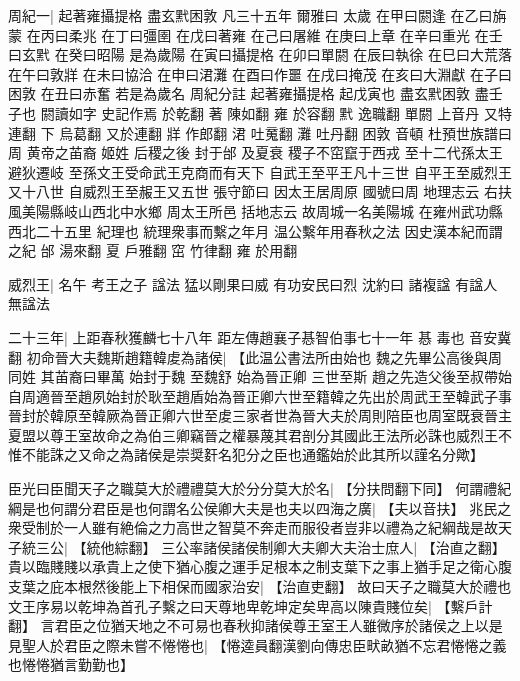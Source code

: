 % 
% 
% 

周紀一|{
	起著雍攝提格 盡玄黓困敦 凡三十五年
	爾雅曰
	太歲
	在甲曰閼逢
	在乙曰旃蒙
	在丙曰柔兆
	在丁曰彊圉
	在戊曰著雍
	在己曰屠維
	在庚曰上章
	在辛曰重光
	在壬曰玄黓
	在癸曰昭陽
	是為歲陽
	在寅曰攝提格
	在卯曰單閼
	在辰曰執徐
	在巳曰大荒落
	在午曰敦牂
	在未曰協洽
	在申曰涒灘
	在酉曰作噩
	在戌曰掩茂
	在亥曰大淵獻
	在子曰困敦
	在丑曰赤奮
	若是為歲名
	周紀分註 起著雍攝提格 起戊寅也
	盡玄黓困敦 盡壬子也
	閼讀如字 史記作焉 於乾翻
	著 陳如翻
	雍 於容翻
	黓 逸職翻
	單閼 上音丹 又特連翻
	下 烏葛翻 又於連翻
	牂 作郎翻
	涒 吐䰟翻
	灘 吐丹翻
	困敦 音頓
	杜預世族譜曰 周 黄帝之苖裔 姬姓
	后稷之後 封于邰 及夏衰 稷子不窋竄于西戎
	至十二代孫太王 避狄遷岐
	至孫文王受命武王克商而有天下
	自武王至平王凡十三世
	自平王至威烈王又十八世
	自威烈王至赧王又五世
	張守節曰 因太王居周原 國號曰周
	地理志云 右扶風美陽縣岐山西北中水鄉 周太王所邑
	括地志云 故周城一名美陽城 在雍州武功縣西北二十五里 紀理也 統理衆事而繫之年月
	温公繫年用春秋之法 因史漢本紀而謂之紀
	邰 湯來翻
	夏 戶雅翻
	窋 竹律翻
	雍 於用翻}
\par
威烈王|{
	名午 考王之子
	諡法 猛以剛果曰威 有功安民曰烈
	沈約曰 諸複諡 有諡人 無諡法}
\par
二十三年|{
	上距春秋獲麟七十八年 距左傳趙襄子惎智伯事七十一年
	惎 毒也 音安冀翻}
初命晉大夫魏斯趙籍韓䖍為諸侯|{
	【此温公書法所由始也
	魏之先畢公高後與周同姓 其苖裔曰畢萬 始封于魏
	至魏舒 始為晉正卿 三世至斯
	趙之先造父後至叔帶始自周適晉至趙夙始封於耿至趙盾始為晉正卿六世至籍韓之先出於周武王至韓武子事晉封於韓原至韓厥為晉正卿六世至䖍三家者世為晉大夫於周則陪臣也周室既衰晉主夏盟以尊王室故命之為伯三卿竊晉之權暴蔑其君剖分其國此王法所必誅也威烈王不惟不能誅之又命之為諸侯是崇奨姧名犯分之臣也通鑑始於此其所以謹名分歟】}
\par
臣光曰臣聞天子之職莫大於禮禮莫大於分分莫大於名|{
	【分扶問翻下同】}
何謂禮紀綱是也何謂分君臣是也何謂名公侯卿大夫是也夫以四海之廣|{
	【夫以音扶】}
兆民之衆受制於一人雖有絶倫之力高世之智莫不奔走而服役者豈非以禮為之紀綱哉是故天子統三公|{
	【統他綜翻】}
三公率諸侯諸侯制卿大夫卿大夫治士庶人|{
	【治直之翻】}
貴以臨賤賤以承貴上之使下猶心腹之運手足根本之制支葉下之事上猶手足之衛心腹支葉之庇本根然後能上下相保而國家治安|{
	【治直吏翻】}
故曰天子之職莫大於禮也文王序易以乾坤為首孔子繫之曰天尊地卑乾坤定矣卑高以陳貴賤位矣|{
	【繫戶計翻】}
言君臣之位猶天地之不可易也春秋抑諸侯尊王室王人雖微序於諸侯之上以是見聖人於君臣之際未嘗不惓惓也|{
	【惓逵員翻漢劉向傳忠臣畎畝猶不忘君惓惓之義也惓惓猶言勤勤也】}
